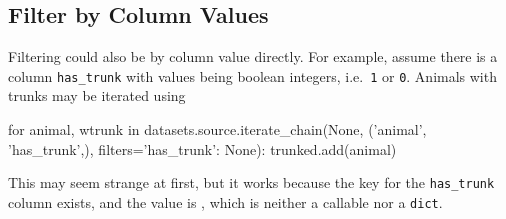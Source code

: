 \subsection*{Filter by Column Values}

Filtering could also be by column value directly.  For example, assume
there is a column \texttt{has\_trunk} with values being boolean
integers, i.e.\ \texttt{1} or \texttt{0}.  Animals with trunks may be
iterated using
\begin{python}
for animal, wtrunk in datasets.source.iterate_chain(None,
                      ('animal', 'has_trunk',),
                      filters={'has_trunk': None}):
    trunked.add(animal)
\end{python}
This may seem strange at first, but it works because the key for
the \texttt{has\_trunk} column exists, and the value is
\pyNone, which is neither a callable nor a \texttt{dict}.




